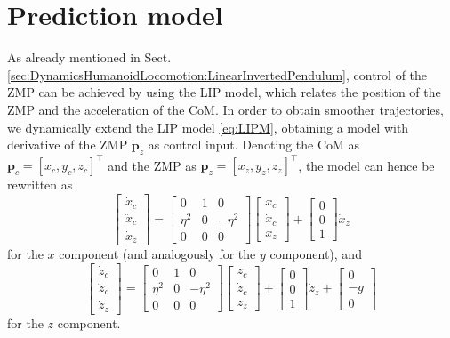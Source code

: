 \section{Prediction model}
As already mentioned in Sect. \ref{sec:DynamicsHumanoidLocomotion:LinearInvertedPendulum},
control of the ZMP can be achieved by using the LIP model, which relates the 
position of the ZMP and the acceleration of the CoM. In order to obtain smoother
trajectories, we dynamically extend the LIP model \eqref{eq:LIPM}, obtaining a
model with derivative of the ZMP $\dot{\bm{p}}_z$ as control input. Denoting
the CoM as $\bm{p}_c = [x_c, y_c, z_c]^\top$ and the ZMP as $\bm{p}_z = [x_z, y_z, z_z]^\top$, the 
model can hence be rewritten as
\begin{equation}
    \label{eq:LIPM-x-dynamic-extension}
    \begin{bmatrix}
        \dot{x}_c \\ \ddot{x}_c \\ \dot{x}_z 
    \end{bmatrix}
    =
    \begin{bmatrix}
        0 & 1 & 0 \\ 
        \eta^2 & 0 & -\eta^2 \\
        0 & 0 & 0
    \end{bmatrix}
    \begin{bmatrix}
        x_c \\ \dot{x}_c \\ x_z 
    \end{bmatrix}
    +
    \begin{bmatrix}
        0 \\ 0 \\ 1
    \end{bmatrix}
    \dot{x}_z
\end{equation}
for the $x$ component (and analogously for the $y$ component), and
\begin{equation}
    \label{eq:LIPM-x-dynamic-extension}
    \begin{bmatrix}
        \dot{z}_c \\ \ddot{z}_c \\ \dot{z}_z 
    \end{bmatrix}
    =
    \begin{bmatrix}
        0 & 1 & 0 \\ 
        \eta^2 & 0 & -\eta^2 \\
        0 & 0 & 0
    \end{bmatrix}
    \begin{bmatrix}
        z_c \\ \dot{z}_c \\ z_z 
    \end{bmatrix}
    +
    \begin{bmatrix}
        0 \\ 0 \\ 1
    \end{bmatrix}
    \dot{z}_z
    +
    \begin{bmatrix}
        0 \\ -g \\ 0
    \end{bmatrix}
\end{equation}
for the $z$ component.

